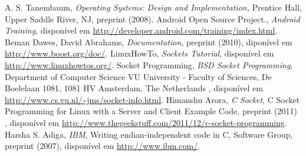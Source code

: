 \documentclass[12pt,a4paper]{article}
\begin{document}
\begin{thebibliography}{99}

 A. S. Tanembaum, {\it Operating Systems: Design and Implementation,} Prentice Hall, Upper Saddle River, NJ, preprint (2008).
 Android Open Source Project., {\it Android Training,}  disponível em \url{http://developer.android.com/training/index.html}.
 Beman Dawes, David Abrahams, \emph{Documentation},  preprint (2010), diponível em \url{http://www.boost.org/doc/}.
 LinuxHowTo, \emph{Sockets Tutorial}, disponível em \url{http://www.linuxhowtos.org/}.
 Socket Programming, \emph{BSD Socket Programming}, Department of Computer Science VU University - Faculty of Sciences, De Boelelaan 1081, 1081 HV Amsterdam, The Netherlands , disponível em \url{http://www.cs.vu.nl/~jms/socket-info.html}.
 Himanshu Arora, \emph{C Socket}, C Socket Programming for Linux with a Server and Client Example Code, preprint (2011) , disponível em \url{http://www.thegeekstuff.com/2011/12/c-socket-programming}.
 Harsha S. Adiga, \emph{IBM}, Writing endian-independent code in C, Software Group, preprint (2007), disponível em \url{http://www.ibm.com/}.



\end{thebibliography}
\end{document}

